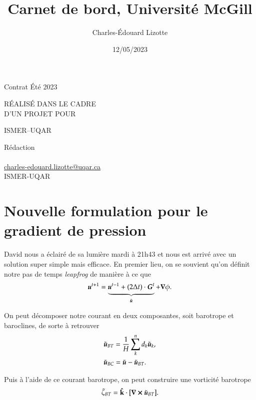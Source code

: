 \documentclass[10pt]{article}
\author{Charles-Édouard Lizotte}
\date{12/05/2023}
\title{Carnet de bord, Université McGill}
\makeatletter
\numberwithin{equation}{section}
\newcommand{\kvf}{\vb{\hat{k}}}
\newcommand{\uu}{\vb*{u}}
\newcommand{\mytitlepage}{
\begin{titlepage}
\begin{center}
{\Large Contrat Été 2023 \par}
\vspace{2cm}
{\Large \MakeUppercase{\thetitle} \par}
\vspace{2cm}
RÉALISÉ DANS LE CADRE\\ D'UN PROJET POUR \par
\vspace{2cm}
{\Large ISMER--UQAR \par}
\vspace{2cm}
{\thedate}
\end{center}
\vfill
Rédaction \\
{\theauthor}\\
\url{charles-edouard.lizotte@uqar.ca}\\
ISMER-UQAR
\end{titlepage}
}
\makeatother
\begin{document}
\mytitlepage
\tableofcontents\newpage

\section{Nouvelle formulation pour le gradient de pression}
\label{sec:org9875166}

David nous a éclairé de sa lumière mardi à 21h43 et nous est arrivé avec un solution super simple mais efficace.
En premier lieu, on se souvient qu'on définit notre pas de temps \emph{leapfrog} de manière à ce que
\begin{equation}
 \uu^{t+1} = \underbrace{ \uu^{t-1} + (2\Delta t)\cdot \vb*{G}^t}_{\tilde{\uu}} + \gradient{\phi}.
\end{equation}

On peut décomposer notre courant en deux composantes, soit barotrope et baroclines, de sorte à retrouver
\begin{subequations}
\begin{align}
 & \tilde{\uu}_{BT} = \frac{1}{H} \sum_k^n d_k \tilde{\uu}_k, \\
 & \tilde{\uu}_{BC} = \tilde{\uu} - \tilde{\uu}_{BT}.
\end{align}
\end{subequations}

Puis à l'aide de ce courant barotrope, on peut construire une vorticité barotrope
\begin{equation}
 \tilde{\zeta}_{BT} = \kvf \cdot \qty[\curl{\tilde{\uu}_{BT}}].
\end{equation}
\end{document}
